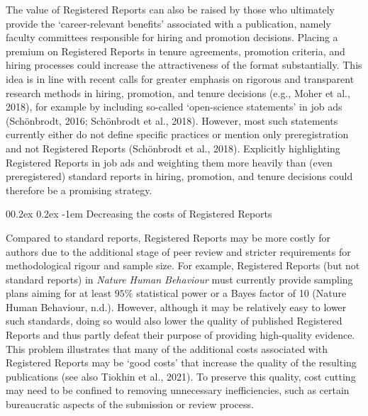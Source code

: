 \documentclass[
  ,man,mask,floatsintext]{apa6}
\makeatletter
\let\oldparagraph\paragraph
\renewcommand{\paragraph}[1]{\oldparagraph{#1}\mbox{}}
\renewcommand{\paragraph}{\@startsection{paragraph}{4}{\parindent}%
  {0\baselineskip \@plus 0.2ex \@minus 0.2ex}%
  {-1em}%
  {\normalfont\normalsize\bfseries\itshape\typesectitle}}
\makeatother
\begin{document}
The value of Registered Reports can also be raised by those who ultimately provide the `career-relevant benefits' associated with a publication, namely faculty committees responsible for hiring and promotion decisions.
Placing a premium on Registered Reports in tenure agreements, promotion criteria, and hiring processes could increase the attractiveness of the format substantially.
This idea is in line with recent calls for greater emphasis on rigorous and transparent research methods in hiring, promotion, and tenure decisions (e.g., Moher et al., 2018), for example by including so-called `open-science statements' in job ads (Schönbrodt, 2016; Schönbrodt et al., 2018).
However, most such statements currently either do not define specific practices or mention only preregistration and not Registered Reports (Schönbrodt et al., 2018).
Explicitly highlighting Registered Reports in job ads and weighting them more heavily than (even preregistered) standard reports in hiring, promotion, and tenure decisions could therefore be a promising strategy.

\par\vspace{0.4\baselineskip}

\hypertarget{decreasing-the-costs-of-registered-reports}{%
\paragraph{Decreasing the costs of Registered Reports}\label{decreasing-the-costs-of-registered-reports}}

Compared to standard reports, Registered Reports may be more costly for authors due to the additional stage of peer review
and stricter requirements for methodological rigour and sample size.
For example, Registered Reports (but not standard reports) in \emph{Nature Human Behaviour} must currently provide sampling plans aiming for at least \(95\%\) statistical power or a Bayes factor of 10 (Nature Human Behaviour, n.d.).
However, although it may be relatively easy to lower such standards,
doing so would also lower the quality of published Registered Reports and thus partly defeat their purpose of providing high-quality evidence.
This problem illustrates that many of the additional costs associated with Registered Reports may be `good costs' that increase the quality of the resulting publications (see also Tiokhin et al., 2021).
To preserve this quality, cost cutting may need to be confined to removing unnecessary inefficiencies, such as certain bureaucratic aspects of the submission or review process.
\end{document}
